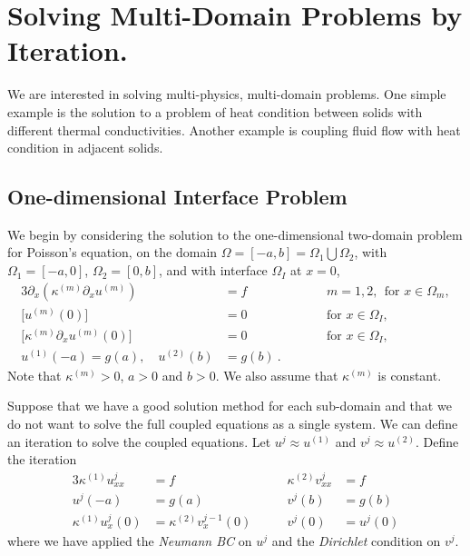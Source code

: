 \documentclass[11pt]{article}
\begin{document}
\tableofcontents

\vfill\eject


\section{Solving Multi-Domain Problems by Iteration.}

% 

We are interested in solving multi-physics, multi-domain problems.
% 
One simple example is the solution to a problem of heat condition between
solids with different thermal conductivities. Another example is coupling
fluid flow with heat condition in adjacent solids.




\newcommand{\kappam}{\kappa^{(m)}}
\newcommand{\um}{u^{(m)}}
\newcommand{\uI}{u^{(1)}}
\newcommand{\uII}{u^{(2)}}
\newcommand{\kappaI}{\kappa^{(1)}}
\newcommand{\kappaII}{\kappa^{(2)}}
\newcommand{\jump}[1]{\Big[#1\Big]}
\newcommand{\up}{u^p}
\newcommand{\vp}{v^p}
\newcommand{\uh}{\hat{u}}
\newcommand{\vh}{\hat{v}}

\subsection{One-dimensional Interface Problem}

We begin by considering the solution to the one-dimensional two-domain problem for Poisson's equation,
on the domain $\Omega = [-a,b] = \Omega_1 \bigcup \Omega_2 $,  with $\Omega_1=[-a,0]$, $\Omega_2=[0,b]$,
and with interface $\Omega_I$ at $x=0$,
\begin{alignat}{3}
  \partial_x( \kappam \partial_x \um ) &= f &&\qquad m=1,2, ~~\text{for $x\in \Omega_m$}, \\
  \jump{ \um(0) } &= 0  &&\qquad \text{for $x\in \Omega_I$}, \\
  \jump{ \kappam \partial_x \um(0) } &= 0 &&\qquad \text{for $x\in \Omega_I$},\\
  \uI(-a)=g(a), \quad \uII(b) &=g(b)  ~.
\end{alignat}
Note that $\kappam>0$, $a>0$ and $b>0$. We also assume that $\kappam$ is constant. 


Suppose that we have a good solution method for each sub-domain and that we do not want to
solve the full coupled equations as a single system.
We can define an iteration to solve the coupled equations. Let $u^j \approx\uI$ and $v^j\approx \uII$.
Define the iteration
\begin{alignat}{3}
  \kappaI u_{xx}^j  &= f &  \kappaII v_{xx}^j &= f \\
    u^j(-a)&=g(a)      &  v^j(b)&=g(b) \\
  \kappaI u^j_x(0) &= \kappaII v^{j-1}_x(0)  \qquad  & v^j(0) &= u^{j}(0) 
\end{alignat}
where we have applied the {\em Neumann BC} on $u^j$ and the {\em Dirichlet} condition on $v^j$. 
\end{document}
